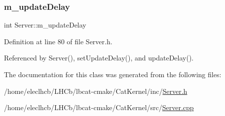 \subsubsection{\texorpdfstring{m\+\_\+update\+Delay}{m\_updateDelay}}
{\footnotesize\ttfamily int Server\+::m\+\_\+update\+Delay\hspace{0.3cm}{\ttfamily [private]}}



Definition at line 80 of file Server.\+h.



Referenced by Server(), set\+Update\+Delay(), and update\+Delay().



The documentation for this class was generated from the following files\+:\begin{DoxyCompactItemize}
\item 
/home/eleclhcb/\+L\+H\+Cb/lbcat-\/cmake/\+Cat\+Kernel/inc/\hyperlink{Server_8h}{Server.\+h}\item 
/home/eleclhcb/\+L\+H\+Cb/lbcat-\/cmake/\+Cat\+Kernel/src/\hyperlink{Server_8cpp}{Server.\+cpp}\end{DoxyCompactItemize}
